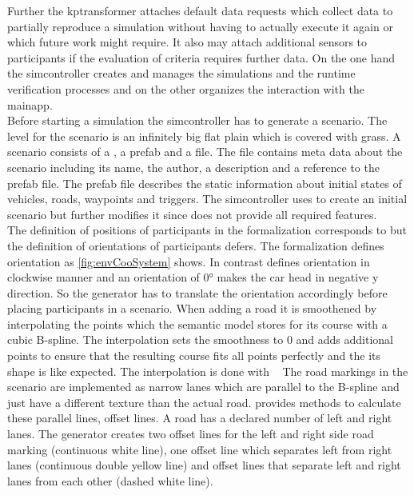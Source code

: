 Further the \gls{kptransformer} attaches default data requests which collect data to partially reproduce a simulation without having to actually execute it again or which future work might require.
It also may attach additional sensors to participants if the evaluation of criteria requires further data.
On the one hand the \gls{simcontroller} creates and manages the simulations and the runtime verification processes and on the other organizes the interaction with the \gls{mainapp}.\\
Before starting a simulation the \gls{simcontroller} has to generate a \beamng{} scenario.
The level for the scenario is an infinitely big flat plain which is covered with grass.
A \beamng{} scenario consists of a \json{}, a prefab and a \lua{} file.
The \json{} file contains meta data about the scenario including its name, the author, a description and a reference to the prefab file.
The prefab file describes the static information about initial states of vehicles, roads, waypoints and \lua{} triggers.
The \gls{simcontroller} uses \beamngpy{} to create an initial \beamng{} scenario but further modifies it since \beamngpy{} does not provide all required features.\\
The definition of positions of participants in the formalization corresponds to \beamng{} but the definition of orientations of participants defers.
The formalization defines orientation as \cref{fig:envCooSystem} shows.
In contrast \beamng{} defines orientation in clockwise manner and an orientation of \ang{0} makes the car head in negative y direction.
So the generator has to translate the orientation accordingly before placing participants in a \beamng{} scenario.
When adding a road it is smoothened by interpolating the points which the semantic model stores for its course with a cubic B-spline.
The interpolation sets the smoothness to \num{0} and adds additional points to ensure that the resulting course fits all points perfectly and the its shape is like expected.
The interpolation is done with \scipy{}~\cite{scipy}
The road markings in the scenario are implemented as narrow lanes which are parallel to the B-spline and just have a different texture than the actual road.
\scipy{} provides methods to calculate these parallel lines, \ie{} offset lines.
A road has a declared number of left and right lanes.
The generator creates two offset lines for the left and right side road marking (continuous white line), one offset line which separates left from right lanes (continuous double yellow line) and offset lines that separate left and right lanes from each other (dashed white line).
